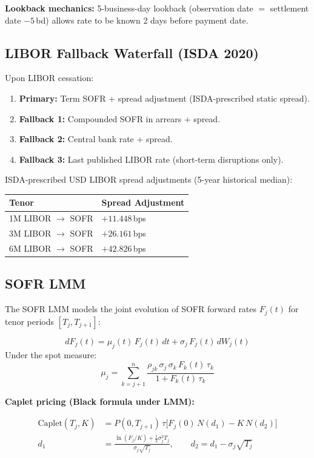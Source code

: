 \documentclass{apex_mdd}
\begin{document}
\textbf{Lookback mechanics:} 5-business-day lookback (observation date $=$ settlement date $-5$\,bd) allows rate to be known 2 days before payment date.

\subsection{LIBOR Fallback Waterfall (ISDA 2020)}
Upon LIBOR cessation:
\begin{enumerate}
  \item \textbf{Primary:} Term SOFR + spread adjustment (ISDA-prescribed static spread).
  \item \textbf{Fallback 1:} Compounded SOFR in arrears + spread.
  \item \textbf{Fallback 2:} Central bank rate + spread.
  \item \textbf{Fallback 3:} Last published LIBOR rate (short-term disruptions only).
\end{enumerate}

ISDA-prescribed USD LIBOR spread adjustments (5-year historical median):
\begin{center}
\small
\begin{tabular}{ll}
\toprule
\textbf{Tenor} & \textbf{Spread Adjustment} \\
\midrule
1M LIBOR $\to$ SOFR & $+11.448$\,bps \\
3M LIBOR $\to$ SOFR & $+26.161$\,bps \\
6M LIBOR $\to$ SOFR & $+42.826$\,bps \\
\bottomrule
\end{tabular}
\end{center}

\subsection{SOFR LMM}
The SOFR LMM models the joint evolution of SOFR forward rates $F_j(t)$ for tenor periods $[T_j, T_{j+1}]$:
\begin{formulabox}
\[
  dF_j(t) = \mu_j(t)\,F_j(t)\,dt + \sigma_j\,F_j(t)\,dW_j(t)
\]
Under the spot measure:
\[
  \mu_j = \sum_{k=j+1}^{n} \frac{\rho_{jk}\,\sigma_j\,\sigma_k\,F_k(t)\,\tau_k}{1 + F_k(t)\,\tau_k}
\]
\end{formulabox}

\textbf{Caplet pricing (Black formula under LMM):}
\begin{formulabox}
\begin{align*}
  \mathrm{Caplet}(T_j,K) &= P(0,T_{j+1})\,\tau\bigl[F_j(0)\,N(d_1) - K\,N(d_2)\bigr]\\
  d_1 &= \frac{\ln(F_j/K) + \tfrac{1}{2}\sigma_j^2 T_j}{\sigma_j\sqrt{T_j}},\qquad d_2 = d_1 - \sigma_j\sqrt{T_j}
\end{align*}
\end{formulabox}
\end{document}
